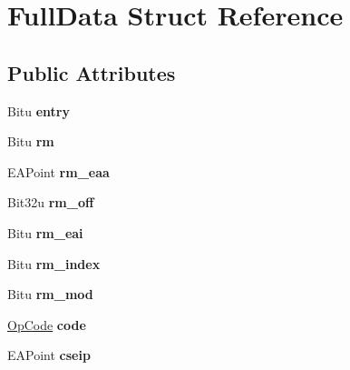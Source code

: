 \hypertarget{structFullData}{\section{Full\-Data Struct Reference}
\label{structFullData}
}
\subsection*{Public Attributes}
\begin{DoxyCompactItemize}
\item 
\hypertarget{structFullData_ae845e6bcb2d15f3da57ab4f1b6b52204}{Bitu {\bfseries entry}}\label{structFullData_ae845e6bcb2d15f3da57ab4f1b6b52204}

\item 
\hypertarget{structFullData_ab68f5d25de81055ff6b4caabab04b542}{Bitu {\bfseries rm}}\label{structFullData_ab68f5d25de81055ff6b4caabab04b542}

\item 
\hypertarget{structFullData_ad2b350d9c74c3d4898c0416f7314a0ad}{E\-A\-Point {\bfseries rm\-\_\-eaa}}\label{structFullData_ad2b350d9c74c3d4898c0416f7314a0ad}

\item 
\hypertarget{structFullData_ace2658b40a633e40622ef1b045884941}{Bit32u {\bfseries rm\-\_\-off}}\label{structFullData_ace2658b40a633e40622ef1b045884941}

\item 
\hypertarget{structFullData_a29d625bc4467f56d1f2ccba8d2e5061d}{Bitu {\bfseries rm\-\_\-eai}}\label{structFullData_a29d625bc4467f56d1f2ccba8d2e5061d}

\item 
\hypertarget{structFullData_a7db0d74b897cbee1196238817a04f027}{Bitu {\bfseries rm\-\_\-index}}\label{structFullData_a7db0d74b897cbee1196238817a04f027}

\item 
\hypertarget{structFullData_a61aa9e11cea8bfd2e43b8f30fe697e07}{Bitu {\bfseries rm\-\_\-mod}}\label{structFullData_a61aa9e11cea8bfd2e43b8f30fe697e07}

\item 
\hypertarget{structFullData_a614d118d26554f400d3db7881b979acf}{\hyperlink{structOpCode}{Op\-Code} {\bfseries code}}\label{structFullData_a614d118d26554f400d3db7881b979acf}

\item 
\hypertarget{structFullData_adfdcabe226cca882391d45f069414b1e}{E\-A\-Point {\bfseries cseip}}\label{structFullData_adfdcabe226cca882391d45f069414b1e}


\end{DoxyCompactItemize}
